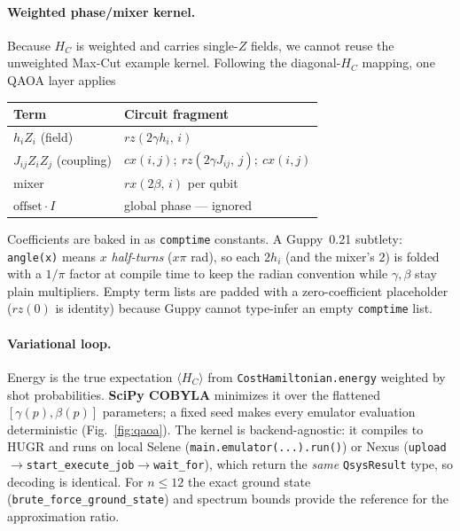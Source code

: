 \documentclass[10pt]{article}
\begin{document}
\paragraph{Weighted phase/mixer kernel.} Because $H_C$ is weighted and carries
single-$Z$ fields, we cannot reuse the unweighted Max-Cut example kernel.
Following the diagonal-$H_C$ mapping, one QAOA layer applies

\smallskip
\begin{tabular}{@{}ll@{}}
\toprule
Term & Circuit fragment\\
\midrule
$h_i Z_i$ (field)      & $rz(2\gamma h_i,\,i)$\\
$J_{ij}Z_iZ_j$ (coupling) & $cx(i,j);\ rz(2\gamma J_{ij},\,j);\ cx(i,j)$\\
mixer                  & $rx(2\beta,\,i)$ per qubit\\
$\text{offset}\cdot I$ & global phase --- ignored\\
\bottomrule
\end{tabular}
\smallskip

\noindent Coefficients are baked in as \texttt{comptime} constants. A Guppy~0.21
subtlety: \texttt{angle(x)} means $x$ \emph{half-turns} ($x\pi$ rad), so each
$2h_i$ (and the mixer's $2$) is folded with a $1/\pi$ factor at compile time to
keep the radian convention while $\gamma,\beta$ stay plain multipliers. Empty
term lists are padded with a zero-coefficient placeholder ($rz(0)$ is identity)
because Guppy cannot type-infer an empty \texttt{comptime} list.

\paragraph{Variational loop.} Energy is the true expectation $\langle
H_C\rangle$ from \texttt{CostHamiltonian.energy} weighted by shot
probabilities. \textbf{SciPy COBYLA} minimizes it over the flattened
$[\gamma(p),\beta(p)]$ parameters; a fixed seed makes every emulator evaluation
deterministic (Fig.~\ref{fig:qaoa}). The kernel is backend-agnostic: it compiles
to HUGR and runs on local Selene (\texttt{main.emulator(...).run()}) or Nexus
(\texttt{upload}$\to$\texttt{start\_execute\_job}$\to$\texttt{wait\_for}), which
return the \emph{same} \texttt{QsysResult} type, so decoding is identical. For
$n\le12$ the exact ground state (\texttt{brute\_force\_ground\_state}) and
spectrum bounds provide the reference for the approximation ratio.
\end{document}
